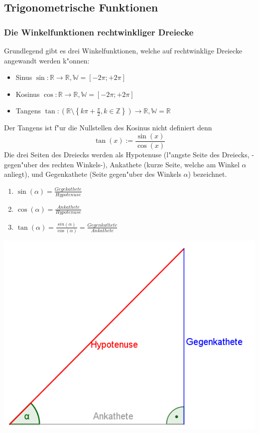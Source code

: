 \subsection{Trigonometrische Funktionen}
\subsubsection{Die Winkelfunktionen rechtwinkliger Dreiecke}
Grundlegend gibt es drei Winkelfunktionen, welche auf rechtwinklige Dreiecke angewandt werden k"onnen:
\begin{itemize}
\item Sinus $\sin : \mathbb{R} \to \mathbb{R}, \mathbb{W} = \left[-2\pi;+2\pi \right]$
\item Kosinus $\cos : \mathbb{R} \to \mathbb{R}, \mathbb{W} = \left[ -2\pi;+2 \pi \right]$
\item Tangens $\tan : \left( \mathbb{R} \setminus \left\{ k \pi + \frac{\pi}{2}, k \in \mathbb{Z} \right\} \right) \to \mathbb{R}, \mathbb{W} = \mathbb{R}$
\end{itemize}
Der Tangens ist f"ur die Nullstellen des Kosinus nicht definiert denn
\begin{equation}
\tan(x) := \frac{\sin(x)}{\cos(x)}
\end{equation}
Die drei Seiten des Dreiecks werden als Hypotenuse (l"angste Seite des Dreiecks, -gegen"uber des rechten Winkels-), Ankathete (kurze Seite, welche am Winkel $\alpha$ anliegt), und Gegenkathete (Seite gegen"uber des Winkels $\alpha$) bezeichnet.
\begin{minipage}{7 cm}
\begin{enumerate}
\item $\sin(\alpha)=\frac{Gegekathete}{Hypotenuse}$
\item $\cos(\alpha)=\frac{Ankathete}{Hypotenuse}$
\item $\tan(\alpha)=\frac{sin(\alpha)}{\cos(\alpha)}= \frac{Gegenkathete}{Ankathete}$
\end{enumerate}
\end{minipage}
\begin{minipage}{6 cm}
\includegraphics[width = 6 cm]{pictures/TrigonDreieck}
\end{minipage}

